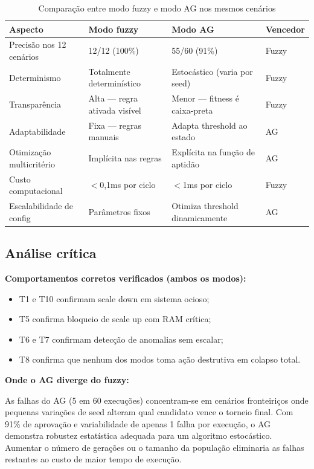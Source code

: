 \documentclass[12pt, a4paper]{article}
\begin{document}
\begin{table}[H]
  \centering
  \caption{Comparação entre modo fuzzy e modo AG nos mesmos cenários}
  \label{tab:comparacao}
  \begin{tabularx}{\textwidth}{lXXl}
    \toprule
    \rowcolor{headerblue}
    \textbf{Aspecto} & \textbf{Modo fuzzy} & \textbf{Modo AG} & \textbf{Vencedor} \\
    \midrule
    Precisão nos 12 cenários & 12/12 (100\%) & 55/60 (91\%) & Fuzzy \\
    Determinismo             & Totalmente determinístico & Estocástico (varia por seed) & Fuzzy \\
    Transparência            & Alta — regra ativada visível & Menor — fitness é caixa-preta & Fuzzy \\
    Adaptabilidade           & Fixa — regras manuais & Adapta threshold ao estado & AG \\
    Otimização multicritério & Implícita nas regras & Explícita na função de aptidão & AG \\
    Custo computacional      & $<$0{,}1ms por ciclo & $<$1ms por ciclo & Fuzzy \\
    Escalabilidade de config & Parâmetros fixos & Otimiza threshold dinamicamente & AG \\
    \bottomrule
  \end{tabularx}
\end{table}

\subsection{Análise crítica}

\textbf{Comportamentos corretos verificados (ambos os modos):}
\begin{itemize}
  \item T1 e T10 confirmam scale down em sistema ocioso;
  \item T5 confirma bloqueio de scale up com RAM crítica;
  \item T6 e T7 confirmam detecção de anomalias sem escalar;
  \item T8 confirma que nenhum dos modos toma ação destrutiva em colapso total.
\end{itemize}

\textbf{Onde o AG diverge do fuzzy:}

As falhas do AG (5 em 60 execuções) concentram-se em cenários fronteiriços onde pequenas variações de seed alteram qual candidato vence o torneio final. Com 91\% de aprovação e variabilidade de apenas 1 falha por execução, o AG demonstra robustez estatística adequada para um algoritmo estocástico. Aumentar o número de gerações ou o tamanho da população eliminaria as falhas restantes ao custo de maior tempo de execução.
\end{document}

